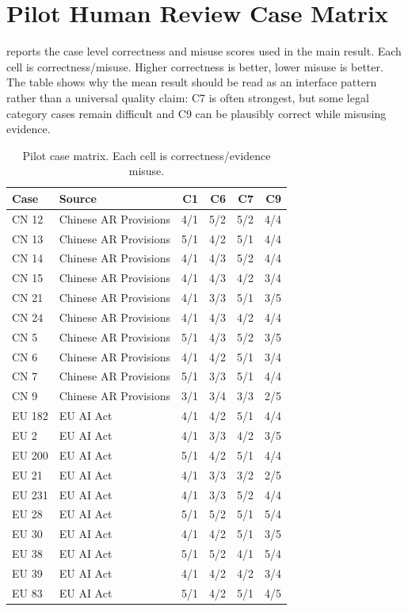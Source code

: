 \documentclass{article}
\begin{document}
\section{Pilot Human Review Case Matrix}

 reports the case level correctness and misuse scores used in the main result. Each cell is correctness/misuse. Higher correctness is better, lower misuse is better. The table shows why the mean result should be read as an interface pattern rather than a universal quality claim: C7 is often strongest, but some legal category cases remain difficult and C9 can be plausibly correct while misusing evidence.

\begin{table}[h]
    \centering
    \caption{Pilot case matrix. Each cell is correctness/evidence misuse.}
    \label{tab:appendix-case-matrix}
    \scriptsize
    \begin{tabular}{p{}p{}rrrr}
        \toprule
        Case & Source & C1 & C6 & C7 & C9 \\
        \midrule
        CN 12 & Chinese AR Provisions & 4/1 & 5/2 & 5/2 & 4/4 \\
        CN 13 & Chinese AR Provisions & 5/1 & 4/2 & 5/1 & 4/4 \\
        CN 14 & Chinese AR Provisions & 4/1 & 4/3 & 5/2 & 4/4 \\
        CN 15 & Chinese AR Provisions & 4/1 & 4/3 & 4/2 & 3/4 \\
        CN 21 & Chinese AR Provisions & 4/1 & 3/3 & 5/1 & 3/5 \\
        CN 24 & Chinese AR Provisions & 4/1 & 4/3 & 4/2 & 4/4 \\
        CN 5 & Chinese AR Provisions & 5/1 & 4/3 & 5/2 & 3/5 \\
        CN 6 & Chinese AR Provisions & 4/1 & 4/2 & 5/1 & 3/4 \\
        CN 7 & Chinese AR Provisions & 5/1 & 3/3 & 5/1 & 4/4 \\
        CN 9 & Chinese AR Provisions & 3/1 & 3/4 & 3/3 & 2/5 \\
        EU 182 & EU AI Act & 4/1 & 4/2 & 5/1 & 4/4 \\
        EU 2 & EU AI Act & 4/1 & 3/3 & 4/2 & 3/5 \\
        EU 200 & EU AI Act & 5/1 & 4/2 & 5/1 & 4/4 \\
        EU 21 & EU AI Act & 4/1 & 3/3 & 3/2 & 2/5 \\
        EU 231 & EU AI Act & 4/1 & 3/3 & 5/2 & 4/4 \\
        EU 28 & EU AI Act & 5/1 & 5/2 & 5/1 & 5/4 \\
        EU 30 & EU AI Act & 4/1 & 4/2 & 5/1 & 3/5 \\
        EU 38 & EU AI Act & 5/1 & 5/2 & 4/1 & 5/4 \\
        EU 39 & EU AI Act & 4/1 & 4/2 & 4/2 & 3/4 \\
        EU 83 & EU AI Act & 5/1 & 4/2 & 5/1 & 4/5 \\
        \bottomrule
    \end{tabular}
\end{table}
\end{document}
